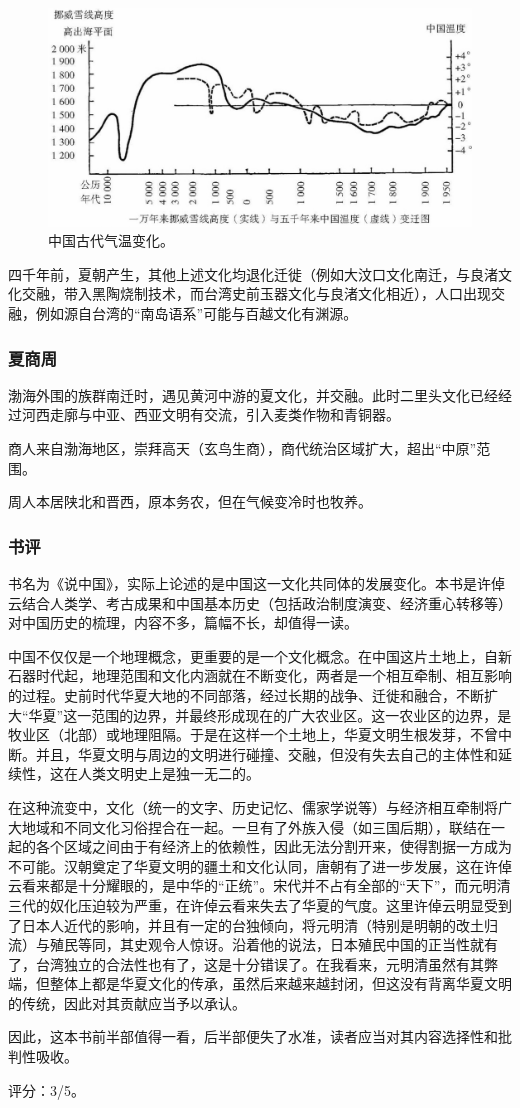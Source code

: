 \begin{figure}[htpb]
\centering
\includegraphics[width=0.8\linewidth]{images/china-tem.png}
\caption{中国古代气温变化。}
\end{figure}

四千年前，夏朝产生，其他上述文化均退化迁徙（例如大汶口文化南迁，与良渚文化交融，带入黑陶烧制技术，而台湾史前玉器文化与良渚文化相近），人口出现交融，例如源自台湾的“南岛语系”可能与百越文化有渊源。

\subsubsection{夏商周}
渤海外围的族群南迁时，遇见黄河中游的夏文化，并交融。此时二里头文化已经经过河西走廓与中亚、西亚文明有交流，引入麦类作物和青铜器。

商人来自渤海地区，崇拜高天（玄鸟生商），商代统治区域扩大，超出“中原”范围。

周人本居陕北和晋西，原本务农，但在气候变冷时也牧养。

\subsubsection{书评}

书名为《说中国》，实际上论述的是中国这一文化共同体的发展变化。本书是许倬云结合人类学、考古成果和中国基本历史（包括政治制度演变、经济重心转移等）对中国历史的梳理，内容不多，篇幅不长，却值得一读。

中国不仅仅是一个地理概念，更重要的是一个文化概念。在中国这片土地上，自新石器时代起，地理范围和文化内涵就在不断变化，两者是一个相互牵制、相互影响的过程。史前时代华夏大地的不同部落，经过长期的战争、迁徙和融合，不断扩大“华夏”这一范围的边界，并最终形成现在的广大农业区。这一农业区的边界，是牧业区（北部）或地理阻隔。于是在这样一个土地上，华夏文明生根发芽，不曾中断。并且，华夏文明与周边的文明进行碰撞、交融，但没有失去自己的主体性和延续性，这在人类文明史上是独一无二的。

在这种流变中，文化（统一的文字、历史记忆、儒家学说等）与经济相互牵制将广大地域和不同文化习俗捏合在一起。一旦有了外族入侵（如三国后期），联结在一起的各个区域之间由于有经济上的依赖性，因此无法分割开来，使得割据一方成为不可能。汉朝奠定了华夏文明的疆土和文化认同，唐朝有了进一步发展，这在许倬云看来都是十分耀眼的，是中华的“正统”。宋代并不占有全部的“天下”，而元明清三代的奴化压迫较为严重，在许倬云看来失去了华夏的气度。这里许倬云明显受到了日本人近代的影响，并且有一定的台独倾向，将元明清（特别是明朝的改土归流）与殖民等同，其史观令人惊讶。沿着他的说法，日本殖民中国的正当性就有了，台湾独立的合法性也有了，这是十分错误了。在我看来，元明清虽然有其弊端，但整体上都是华夏文化的传承，虽然后来越来越封闭，但这没有背离华夏文明的传统，因此对其贡献应当予以承认。

因此，这本书前半部值得一看，后半部便失了水准，读者应当对其内容选择性和批判性吸收。

评分：3/5。